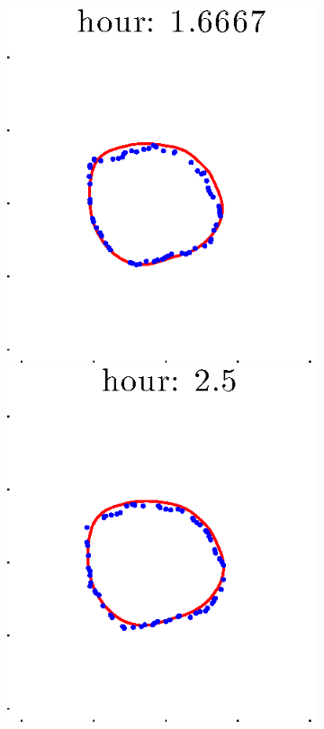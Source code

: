 \documentclass[12pt]{article}
\begin{document}
\begin{figure}[h!]
\begin{subfigure}[b]{.3\textwidth}
		\includegraphics[height=.15\textheight]{Pos5exp2/firsthalf/first3.eps}
		\includegraphics[height=.15\textheight]{Pos5exp2/firsthalf/first4.eps}

\end{subfigure}
\end{figure}
\end{document}

